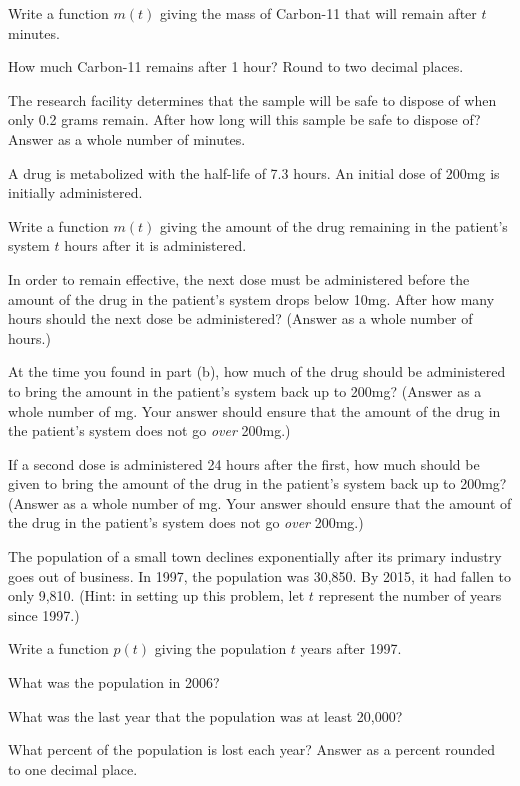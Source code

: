 \begin{senum}
\begin{clist}
\item Write a function $m(t)$ giving the mass of Carbon-11 that will remain after $t$ minutes.
\item How much Carbon-11 remains after 1 hour? Round to two decimal places.
\item The research facility determines that the sample will be safe to dispose of when only 0.2 grams remain. After how long will this sample be safe to dispose of? Answer as a whole number of minutes.
\end{clist}
\item A drug is metabolized with the half-life of 7.3 hours. An initial dose of 200mg is initially administered.
\begin{clist}
\item Write a function $m(t)$ giving the amount of the drug remaining in the patient's system $t$ hours after it is administered.
\item In order to remain effective, the next dose must be administered before the amount of the drug in the patient's system drops below 10mg. After how many hours should the next dose be administered? (Answer as a whole number of hours.)
\item At the time you found in part (b), how much of the drug should be administered to bring the amount in the patient's system back up to 200mg? (Answer as a whole number of mg. Your answer should ensure that the amount of the drug in the patient's system does not go \emph{over} 200mg.)
\item If a second dose is administered 24 hours after the first, how much should be given to bring the amount of the drug in the patient's system back up to 200mg? (Answer as a whole number of mg. Your answer should ensure that the amount of the drug in the patient's system does not go \emph{over} 200mg.)
\end{clist}
\clearpage
\item The population of a small town declines exponentially after its primary industry goes out of business. In 1997, the population was 30,850. By 2015, it had fallen to only 9,810. (Hint: in setting up this problem, let $t$ represent the number of years since 1997.)
\begin{clist}
\item Write a function $p(t)$ giving the population $t$ years after 1997.
\item What was the population in 2006?
\item What was the last year that the population was at least 20,000?
\item What percent of the population is lost each year? Answer as a percent rounded to one decimal place.
\end{clist}
\end{senum}
